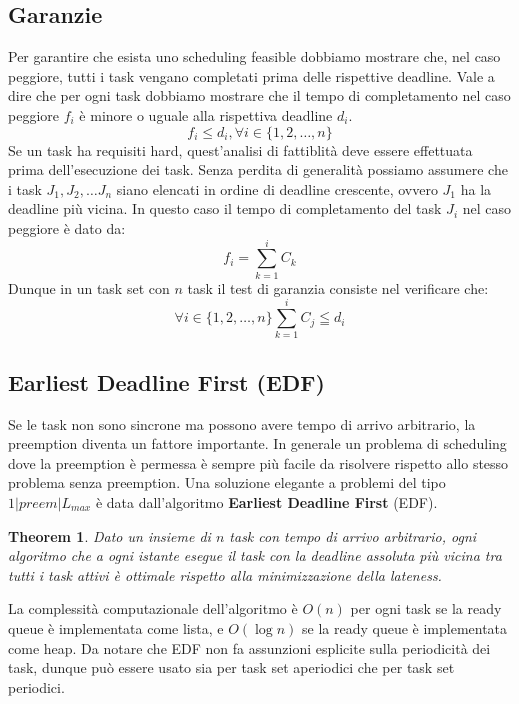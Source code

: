 \documentclass[12pt]{article}
\newtheorem{theorem}{Theorem}
\begin{document}
\subsection{Garanzie}
Per garantire che esista uno scheduling feasible dobbiamo mostrare che, nel caso peggiore, tutti i task vengano completati prima delle rispettive deadline.
Vale a dire che per ogni task dobbiamo mostrare che il tempo di completamento nel caso peggiore $f_i$ è minore o uguale alla rispettiva deadline $d_i$.
\begin{equation}
    f_i \leq d_i , \forall i \in \{1,2,\ldots,n\}
\end{equation}
Se un task ha requisiti hard, quest'analisi di fattiblità deve essere effettuata prima dell'esecuzione dei task.
Senza perdita di generalità possiamo assumere che i task $J_1,J_2,\dots J_n$ siano elencati in ordine di deadline crescente, ovvero $J_1$ ha la deadline più vicina.
In questo caso il tempo di completamento del task $J_i$ nel caso peggiore è dato da:
\begin{equation}
    f_i=\sum_{k=1}^{i} C_k
\end{equation}
Dunque in un task set con $n$ task il test di garanzia consiste nel verificare che:
\begin{equation}
    \forall i \in \{1,2,\dots ,n\} \sum_{k=1}^i C_j \leqq d_i
\end{equation}
\subsection{Earliest Deadline First (EDF)}
Se le task non sono sincrone ma possono avere tempo di arrivo arbitrario, la preemption diventa un fattore importante.
In generale un problema di scheduling dove la preemption è permessa è sempre più facile da risolvere rispetto allo stesso problema senza preemption.
Una soluzione elegante a problemi del tipo $1|preem|L_{max}$ è data dall'algoritmo \textbf{Earliest Deadline First} (EDF).
\begin{theorem}
    Dato un insieme di $n$ task con tempo di arrivo arbitrario, ogni algoritmo che a ogni istante esegue il task con la deadline assoluta più vicina tra tutti i task attivi è ottimale rispetto alla minimizzazione della lateness.
\end{theorem}
La complessità computazionale dell'algoritmo è $O(n)$ per ogni task se la ready queue è implementata come lista, e $O(\log n)$ se la ready queue è implementata come heap.
Da notare che EDF non fa assunzioni esplicite sulla periodicità dei task, dunque può essere usato sia per task set aperiodici che per task set periodici.
\end{document}
